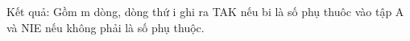 Kết quả:
Gồm m dòng, dòng thứ i ghi ra TAK nếu bi là số phụ thuôc vào tập A và NIE nếu không phải là số phụ thuộc.